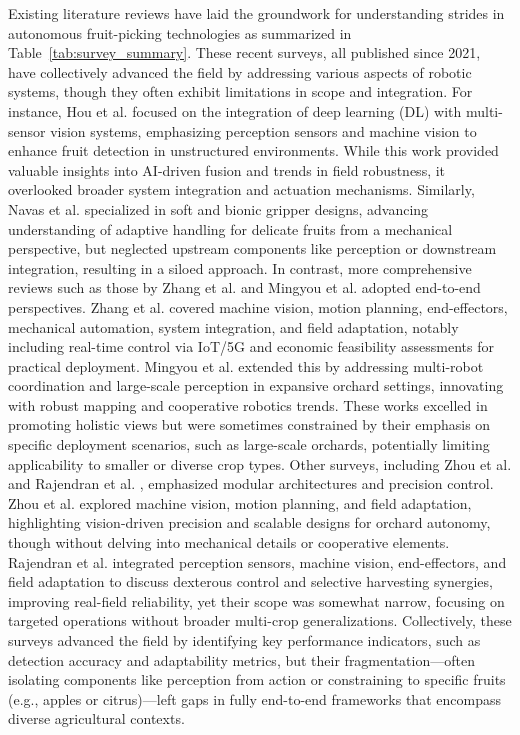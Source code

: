 \documentclass[pdflatex,sn-mathphys-num]{sn-jnl}
\begin{document}
Existing literature reviews have laid the groundwork for understanding strides in autonomous fruit-picking technologies as summarized in Table~\ref{tab:survey_summary}. These recent surveys, all published since 2021, have collectively advanced the field by addressing various aspects of robotic systems, though they often exhibit limitations in scope and integration.
For instance, Hou et al. \cite{hou2023overview} focused on the integration of deep learning (DL) with multi-sensor vision systems, emphasizing perception sensors and machine vision to enhance fruit detection in unstructured environments. While this work provided valuable insights into AI-driven fusion and trends in field robustness, it overlooked broader system integration and actuation mechanisms. Similarly, Navas et al. \cite{navas2021soft} specialized in soft and bionic gripper designs, advancing understanding of adaptive handling for delicate fruits from a mechanical perspective, but neglected upstream components like perception or downstream integration, resulting in a siloed approach.
In contrast, more comprehensive reviews such as those by Zhang et al. \cite{zhang2024automatic} and Mingyou et al. \cite{mingyou2024orchard} adopted end-to-end perspectives. Zhang et al. covered machine vision, motion planning, end-effectors, mechanical automation, system integration, and field adaptation, notably including real-time control via IoT/5G and economic feasibility assessments for practical deployment. Mingyou et al. extended this by addressing multi-robot coordination and large-scale perception in expansive orchard settings, innovating with robust mapping and cooperative robotics trends. These works excelled in promoting holistic views but were sometimes constrained by their emphasis on specific deployment scenarios, such as large-scale orchards, potentially limiting applicability to smaller or diverse crop types.
Other surveys, including Zhou et al. \cite{zhou2022intelligent} and Rajendran et al. \cite{rajendran2024towards}, emphasized modular architectures and precision control. Zhou et al. explored machine vision, motion planning, and field adaptation, highlighting vision-driven precision and scalable designs for orchard autonomy, though without delving into mechanical details or cooperative elements. Rajendran et al. integrated perception sensors, machine vision, end-effectors, and field adaptation to discuss dexterous control and selective harvesting synergies, improving real-field reliability, yet their scope was somewhat narrow, focusing on targeted operations without broader multi-crop generalizations. Collectively, these surveys advanced the field by identifying key performance indicators, such as detection accuracy and adaptability metrics, but their fragmentation—often isolating components like perception from action or constraining to specific fruits (e.g., apples or citrus)—left gaps in fully end-to-end frameworks that encompass diverse agricultural contexts.
\end{document}
